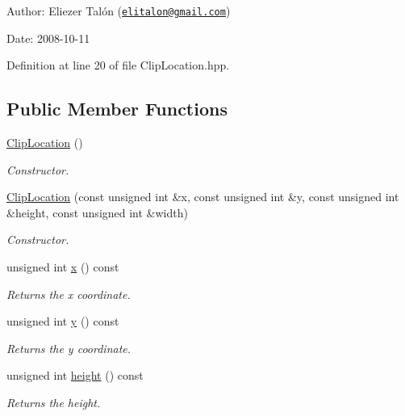 \begin{Desc}
\item[Author:]Eliezer Talón (\href{mailto:elitalon@gmail.com}{\tt elitalon@gmail.com}) \end{Desc}
\begin{Desc}
\item[Date:]2008-10-11 \end{Desc}


Definition at line 20 of file ClipLocation.hpp.\subsection*{Public Member Functions}
\begin{CompactItemize}
\item 
\hyperlink{class_clip_location_fb51ec03e0a8f9b33f4d785550bc6b84}{ClipLocation} ()
\begin{CompactList}\small\item\em Constructor. \item\end{CompactList}\item 
\hyperlink{class_clip_location_df3b25b12a4ce75a657ae79f241c61c2}{ClipLocation} (const unsigned int \&x, const unsigned int \&y, const unsigned int \&height, const unsigned int \&width)
\begin{CompactList}\small\item\em Constructor. \item\end{CompactList}\item 
unsigned int \hyperlink{class_clip_location_580a48aeda8a2714b14c25435da044b3}{x} () const 
\begin{CompactList}\small\item\em Returns the x coordinate. \item\end{CompactList}\item 
unsigned int \hyperlink{class_clip_location_5677e50c8b19980344877fc6d8e0aec0}{y} () const 
\begin{CompactList}\small\item\em Returns the y coordinate. \item\end{CompactList}\item 
unsigned int \hyperlink{class_clip_location_8484a9c0483766baff2c11069290da79}{height} () const 
\begin{CompactList}\small\item\em Returns the height. \item\end{CompactList}\item 

\end{CompactItemize}
